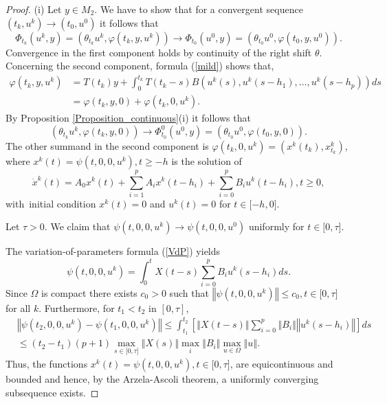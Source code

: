 \documentclass{siamltex}%
\begin{document}
\begin{proof}
(i) Let $y\in M_{2}$. We have to show that for a convergent sequence
$(t_{k},u^{k})\rightarrow(t_{0},u^{0})$ it follows that%
\[
\Phi_{t_{k}}(u^{k},y)=(\theta_{t_{k}}u^{k},\varphi(t_{k},y,u^{k}%
))\rightarrow\Phi_{t_{0}}(u^{0},y)=(\theta_{t_{0}}u^{0},\varphi(t_{0}%
,y,u^{0})).
\]
Convergence in the first component holds by continuity of the right shift
$\theta$. Concerning the second component, formula (\ref{mild}) shows that,%
\begin{align*}
\varphi(t_{k},y,u^{k})  &  =T(t_{k})y+\int_{0}^{t_{k}}T(t_{k}-s)B\left(
u^{k}(s),u^{k}(s-h_{1}),\ldots,u^{k}(s-h_{p})\right)  ds\\
&  =\varphi(t_{k},y,0)+\varphi(t_{k},0,u^{k}).
\end{align*}
By Proposition \ref{Proposition_continuous}(i) it follows that%
\[
(\theta_{t_{k}}u^{k},\varphi(t_{k},y,0))\rightarrow\Phi_{t_{0}}^{0}%
(u^{0},y)=(\theta_{t_{0}}u^{0},\varphi(t_{0},y,0)).
\]
The other summand in the second component is $\varphi(t_{k},0,u^{k}%
)\allowbreak=(x^{k}(t_{k}),x_{t_{k}}^{k})$, where $x^{k}(t)=\psi
(t,0,0,u^{k}),t\geq-h$ is the solution of%
\[
\dot{x}^{k}(t)=A_{0}x^{k}(t)+\sum_{i=1}^{p}A_{i}x^{k}(t-h_{i})+\sum_{i=0}%
^{p}B_{i}u^{k}(t-h_{i}),t\geq0,
\]
with\ initial condition $x^{k}(t)=0$ and $u^{k}(t)=0$ for $t\in\lbrack-h,0]$.

Let $\tau>0$. We claim that $\psi(t,0,0,u^{k})\rightarrow\psi(t,0,0,u^{0})$
uniformly for $t\in\lbrack0,\tau]$.

The variation-of-parameters formula (\ref{VdP}) yields%
\[
\psi(t,0,0,u^{k})=\int_{0}^{t}X(t-s)\sum_{i=0}^{p}B_{i}u^{k}(s-h_{i})ds.
\]
Since $\Omega$ is compact there exists $c_{0}>0$ such that $\left\Vert
\psi(t,0,0,u^{k})\right\Vert \leq c_{0},t\in\lbrack0,\tau]$ for all $k$.
Furthermore, for $t_{1}<t_{2}$ in $[0,\tau]$,%
\begin{align*}
&  \left\Vert \psi(t_{2},0,0,u^{k})-\psi(t_{1},0,0,u^{k})\right\Vert \leq
\int_{t_{1}}^{t_{2}}\left[  \left\Vert X(t-s)\right\Vert \sum_{i=0}%
^{p}\left\Vert B_{i}\right\Vert \left\Vert u^{k}(s-h_{i})\right\Vert \right]
ds\\
&  \leq(t_{2}-t_{1})(p+1)\max_{s\in\lbrack0,\tau]}\left\Vert X(s)\right\Vert
\max_{i}\left\Vert B_{i}\right\Vert \max_{u\in\Omega}\left\Vert u\right\Vert .
\end{align*}
Thus, the functions $x^{k}(t)=\psi(t,0,0,u^{k}),t\in\lbrack0,\tau]$, are
equicontinuous and bounded and hence, by the Arzela-Ascoli theorem, a
uniformly converging subsequence exists.


\end{proof}
\end{document}
